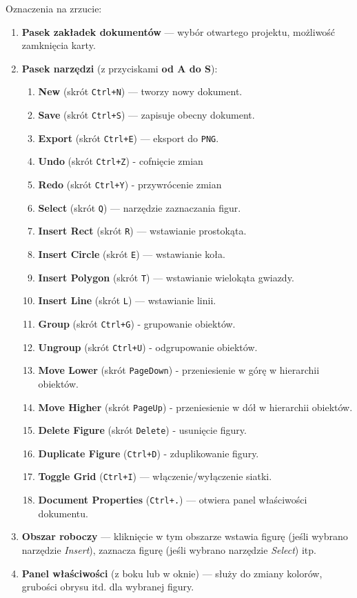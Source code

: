 \documentclass[a4paper,12pt]{article}
\begin{document}
\noindent Oznaczenia na zrzucie:
\begin{enumerate}
    \item \textbf{Pasek zakładek dokumentów} — wybór otwartego projektu, 
    możliwość zamknięcia karty.
    \item \textbf{Pasek narzędzi} (z przyciskami \textbf{od A do S}):
    \begin{enumerate}[label=\alph*)]
        \item \textbf{New} (skrót \texttt{Ctrl+N}) — tworzy nowy dokument.
        \item \textbf{Save} (skrót \texttt{Ctrl+S}) — zapisuje obecny dokument.
        \item \textbf{Export} (skrót \texttt{Ctrl+E}) — eksport do \texttt{PNG}.
        \item \textbf{Undo} (skrót \texttt{Ctrl+Z}) - cofnięcie zmian
        \item \textbf{Redo} (skrót \texttt{Ctrl+Y}) - przywrócenie zmian
        \item \textbf{Select} (skrót \texttt{Q}) — narzędzie zaznaczania figur.
        \item \textbf{Insert Rect} (skrót \texttt{R}) — wstawianie prostokąta.
        \item \textbf{Insert Circle} (skrót \texttt{E}) — wstawianie koła.
        \item \textbf{Insert Polygon} (skrót \texttt{T}) — wstawianie wielokąta gwiazdy.
        \item \textbf{Insert Line} (skrót \texttt{L}) — wstawianie linii.
        \item \textbf{Group} (skrót \texttt{Ctrl+G}) - grupowanie obiektów.
        \item \textbf{Ungroup} (skrót \texttt{Ctrl+U}) - odgrupowanie obiektów.
        \item \textbf{Move Lower} (skrót \texttt{PageDown}) - przeniesienie w górę w hierarchii obiektów.
        \item \textbf{Move Higher} (skrót \texttt{PageUp}) - przeniesienie w dół w hierarchii obiektów.
        \item \textbf{Delete Figure} (skrót \texttt{Delete}) - usunięcie figury.
        \item \textbf{Duplicate Figure} (\texttt{Ctrl+D}) - zduplikowanie figury.
        \item \textbf{Toggle Grid} (\texttt{Ctrl+I}) — włączenie/wyłączenie siatki.
        \item \textbf{Document Properties} (\texttt{Ctrl+.}) — otwiera panel właściwości dokumentu.
    \end{enumerate}
    \item \textbf{Obszar roboczy} — kliknięcie w tym obszarze wstawia figurę 
    (jeśli wybrano narzędzie \emph{Insert}), zaznacza figurę (jeśli wybrano 
    narzędzie \emph{Select}) itp.
    \item \textbf{Panel właściwości} (z boku lub w oknie) — służy do zmiany 
    kolorów, grubości obrysu itd. dla wybranej figury.
\end{enumerate}
\end{document}

